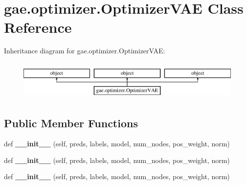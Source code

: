 \hypertarget{classgae_1_1optimizer_1_1OptimizerVAE}{}\section{gae.\+optimizer.\+Optimizer\+V\+AE Class Reference}
\label{classgae_1_1optimizer_1_1OptimizerVAE}
Inheritance diagram for gae.\+optimizer.\+Optimizer\+V\+AE\+:\begin{figure}[H]
\begin{center}
\leavevmode
\includegraphics[height=2.000000cm]{classgae_1_1optimizer_1_1OptimizerVAE}
\end{center}
\end{figure}
\subsection*{Public Member Functions}
\begin{DoxyCompactItemize}
\item 
\mbox{\label{classgae_1_1optimizer_1_1OptimizerVAE_af40d9c5fbf6cc1f3d40a44f8d35393b5}} 
def {\bfseries \+\_\+\+\_\+init\+\_\+\+\_\+} (self, preds, labels, model, num\+\_\+nodes, pos\+\_\+weight, norm)
\item 
\mbox{\label{classgae_1_1optimizer_1_1OptimizerVAE_af40d9c5fbf6cc1f3d40a44f8d35393b5}} 
def {\bfseries \+\_\+\+\_\+init\+\_\+\+\_\+} (self, preds, labels, model, num\+\_\+nodes, pos\+\_\+weight, norm)
\item 
\mbox{\label{classgae_1_1optimizer_1_1OptimizerVAE_af40d9c5fbf6cc1f3d40a44f8d35393b5}} 
def {\bfseries \+\_\+\+\_\+init\+\_\+\+\_\+} (self, preds, labels, model, num\+\_\+nodes, pos\+\_\+weight, norm)
\end{DoxyCompactItemize}
